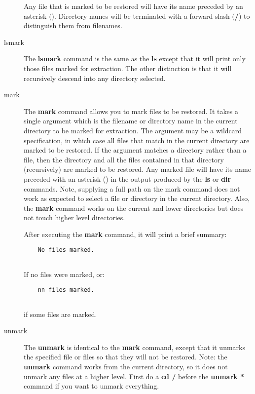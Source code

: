 \begin{description}
   Any file that is marked to be restored will  have its name preceded by an
   asterisk ({\bf *}). Directory names  will be terminated with a forward slash
   ({\bf /}) to distinguish them  from filenames.  

\item [lsmark]
   The {\bf lsmark} command is the same as the  {\bf ls} except that it will
   print only those files marked for  extraction. The other distinction is that
   it will recursively  descend into any directory selected. 

\item [mark]
   The {\bf mark} command allows you to mark files to be restored. It takes a
   single argument which is the filename  or directory name in the current
   directory to be marked for extraction.  The argument may be a wildcard
   specification, in which  case all files that match in the current directory
   are marked to be  restored. If the argument matches a directory rather than a
   file,  then the directory and all the files contained in that directory
   (recursively)  are marked to be restored. Any marked file will have its name 
   preceded with an asterisk ({\bf *}) in the output produced by the  {\bf ls}
or
   {\bf dir} commands. Note, supplying a full path on  the mark command does not
   work as expected to select a file or  directory in the current directory.
   Also, the {\bf mark} command works  on the current and lower directories but
   does not touch higher level  directories.  

   After executing the {\bf mark} command, it will print a brief summary:  

\footnotesize
\begin{verbatim}
    No files marked.
    
\end{verbatim}
\normalsize

   If no files were marked, or:  

\footnotesize
\begin{verbatim}
    nn files marked.
    
\end{verbatim}
\normalsize

   if some files are marked.  

\item [unmark]
   The {\bf unmark} is identical to the {\bf mark}  command, except that it
   unmarks the specified file or files so that  they will not be restored. Note:
   the {\bf unmark} command works from  the current directory, so it does not
   unmark any files at a higher  level. First do a {\bf cd /} before the {\bf
   unmark *} command if  you want to unmark everything.  


\end{description}
